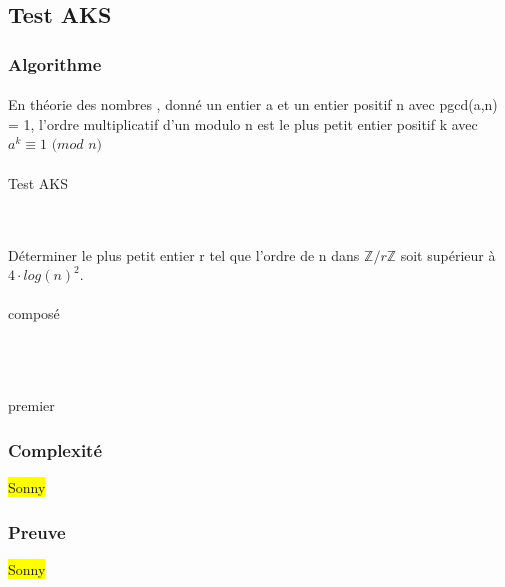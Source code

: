 \subsection{Test AKS}
		

	\subsubsection{Algorithme}
		\paragraph{}
		\vspace{-1.5em}\begin{adjustwidth}{1.5cm}{1.5cm} 
		\begin{Def}
			\label{Ordre}
			En théorie des nombres , donné un entier a et un entier positif n avec pgcd(a,n) = 1, l'ordre multiplicatif d'un modulo n est le plus petit entier positif k avec
			\\
            $a^{k} \equiv 1$ $(mod$ $n)$
		\end{Def}
		\end{adjustwidth}\vspace{0.5em}
		
		\paragraph{}
		\vspace{-1.5em}\begin{adjustwidth}{1.5cm}{1.5cm} 
		\begin{algorithm}[H]
			\caption{Test AKS}\label{TAKS}

			
			\\ \\
			
            Déterminer le plus petit entier r tel que l’ordre de n dans $\mathbb{Z}/r\mathbb{Z}$ soit supérieur à $4 \cdot log(n)^{2}.$
            \\ \\
            
             {\Retour composé\;}
            \\ \\
            \\ \\
            
		\Retour premier\;
		\end{algorithm}
		\end{adjustwidth}\vspace{0.5em}
		
	\subsubsection{Complexité}
		\colorbox{yellow}{Sonny}
	
	\subsubsection{Preuve}
		\colorbox{yellow}{Sonny}